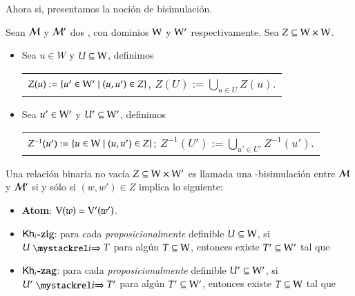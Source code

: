 Ahora si, presentamos la noción de bisimulación.

\begin{definicion}\label{def:bisimulation}
    Sean $\mathcal{M}$ y $\mathcal{M}'$ dos \ultss, con dominios $\mathrm{W}$ y $\mathrm{W}'$ respectivamente. Sea $Z \subseteq \mathrm{W} \times \mathrm{W}$.
    \begin{itemize}
        \item Sea $u \in W$ y $U \subseteq \mathrm{W}$, definimos
        \begin{nscenter}
            \begin{tabular}{@{}c@{}}
                $Z(u) := \{ u' \in \mathrm{W}' \mid (u,u') \in Z \}$, \qquad $Z(U) := \bigcup_{u \in U} Z(u)$.
            \end{tabular}
        \end{nscenter}
        \item Sea $u' \in \mathrm{W}'$ y $U' \subseteq \mathrm{W}'$, definimos
        \begin{nscenter}
            \begin{tabular}{@{}c@{}}
                $Z^{-1}(u') := \{ u \in \mathrm{W} \mid (u,u') \in Z \}$; \qquad $Z^{-1}(U') := \bigcup_{u' \in U'} Z^{-1}(u')$.
            \end{tabular}
        \end{nscenter}
    \end{itemize}

    Una relación binaria no vacía $Z \subseteq \mathrm{W} \times \mathrm{W}'$ es llamada una \KHilogic-bisimulación entre $\mathcal{M}$ y 
    $\mathcal{M}'$ si y sólo si $(w,w') \in Z$ implica lo siguiente:
    \begin{itemize}
        \item \textbf{Atom}: $\mathrm{V}(w)=\mathrm{V}'(w')$.

        \item \textbf{$\mathsf{Kh}_i$-zig}: para cada \emph{proposicionalmente} definible $U \subseteq \mathrm{W}$, si $U \ultsExecAgi T$ para algún $T \subseteq \mathrm{W}$, entonces existe $T' \subseteq \mathrm{W}'$ tal que
        \begin{multicols}{2}
        \end{multicols}
        
        \item \textbf{$\mathsf{Kh}_i$-zag}: para cada \emph{proposicionalmente} definible $U' \subseteq \mathrm{W}'$, si $U' \ultsExecAgi T'$ para algún $T' \subseteq \mathrm{W}'$, entonces existe $T \subseteq \mathrm{W}$ tal que
        \begin{multicols}{2}
        \end{multicols}


\end{itemize}
\end{definicion}
